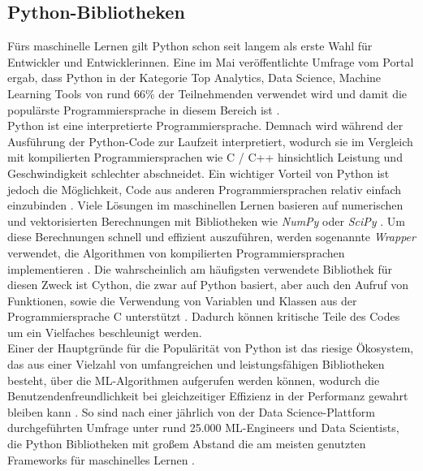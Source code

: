 \documentclass[german,bachelor]{swsLeipzig}
\begin{document}

\subsection{Python-Bibliotheken}
Fürs maschinelle Lernen gilt Python schon seit langem als erste Wahl für Entwickler und Entwicklerinnen.
Eine im Mai \citeyear{nugget} veröffentlichte Umfrage vom Portal \citeauthor{nugget} ergab, dass Python in der Kategorie
\glqq Top Analytics, Data Science, Machine Learning Tools\grqq{} von rund 66\% der Teilnehmenden verwendet wird
und damit die populärste Programmiersprache in diesem Bereich ist \cite{nugget}. \\

Python ist eine interpretierte Programmiersprache.
Demnach wird während der Ausführung der Python-Code zur Laufzeit interpretiert, wodurch sie im Vergleich mit kompilierten
Programmiersprachen wie C / C++ hinsichtlich Leistung und Geschwindigkeit schlechter abschneidet.
Ein wichtiger Vorteil von Python ist jedoch die Möglichkeit, Code aus anderen Programmiersprachen relativ einfach einzubinden \cite[S.977]{8757088}.
Viele Lösungen im maschinellen Lernen basieren auf numerischen und vektorisierten Berechnungen mit Bibliotheken
wie \textit{NumPy} oder \textit{SciPy} \cite[S.977]{8757088}.
Um diese Berechnungen schnell und effizient auszuführen, werden sogenannte \textit{Wrapper} verwendet,
die Algorithmen von kompilierten Programmiersprachen implementieren \cite[S.977]{8757088}.
Die wahrscheinlich am häufigsten verwendete Bibliothek für diesen Zweck ist Cython, die zwar auf Python basiert,
aber auch den Aufruf von Funktionen, sowie die Verwendung von Variablen und Klassen aus der Programmiersprache C unterstützt \cite[S.977]{8757088}.
Dadurch können kritische Teile des Codes um ein Vielfaches beschleunigt werden. \\

Einer der Hauptgründe für die Populärität von Python ist das riesige Ökosystem, das aus einer Vielzahl
von umfangreichen und leistungsfähigen Bibliotheken besteht, über die ML-Algorithmen aufgerufen werden können,
wodurch die Benutzendenfreundlichkeit bei gleichzeitiger Effizienz in der Performanz gewahrt bleiben kann \cite[S. 2]{2020}.
So sind nach einer jährlich von der Data Science-Plattform \citeauthor{kaggle} durchgeführten Umfrage unter rund 25.000 ML-Engineers
und Data Scientists, die Python Bibliotheken mit großem Abstand die am meisten genutzten Frameworks für maschinelles Lernen \cite[]{kaggle}.\\
\end{document}

